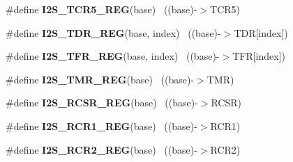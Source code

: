\begin{DoxyCompactItemize}
\item 
\hypertarget{group___i2_s___register___accessor___macros_gad75c8d22ba5ae3b82a7d2251cc70a77b}{}\#define {\bfseries I2\+S\+\_\+\+T\+C\+R5\+\_\+\+R\+E\+G}(base)                                          ~((base)-\/$>$T\+C\+R5)\label{group___i2_s___register___accessor___macros_gad75c8d22ba5ae3b82a7d2251cc70a77b}

\item 
\hypertarget{group___i2_s___register___accessor___macros_ga87e46bded71d5375c77dbe4f93f1fc5c}{}\#define {\bfseries I2\+S\+\_\+\+T\+D\+R\+\_\+\+R\+E\+G}(base,  index)                                ~((base)-\/$>$T\+D\+R\mbox{[}index\mbox{]})\label{group___i2_s___register___accessor___macros_ga87e46bded71d5375c77dbe4f93f1fc5c}

\item 
\hypertarget{group___i2_s___register___accessor___macros_ga836a44a99ae9077cdf8909db381b6b68}{}\#define {\bfseries I2\+S\+\_\+\+T\+F\+R\+\_\+\+R\+E\+G}(base,  index)                                ~((base)-\/$>$T\+F\+R\mbox{[}index\mbox{]})\label{group___i2_s___register___accessor___macros_ga836a44a99ae9077cdf8909db381b6b68}

\item 
\hypertarget{group___i2_s___register___accessor___macros_ga1ca2b4f31362bf93e985588595f2dbd1}{}\#define {\bfseries I2\+S\+\_\+\+T\+M\+R\+\_\+\+R\+E\+G}(base)                                            ~((base)-\/$>$T\+M\+R)\label{group___i2_s___register___accessor___macros_ga1ca2b4f31362bf93e985588595f2dbd1}

\item 
\hypertarget{group___i2_s___register___accessor___macros_gabb9a8ee9dfb5ae4b28895d4cb285ae16}{}\#define {\bfseries I2\+S\+\_\+\+R\+C\+S\+R\+\_\+\+R\+E\+G}(base)                                          ~((base)-\/$>$R\+C\+S\+R)\label{group___i2_s___register___accessor___macros_gabb9a8ee9dfb5ae4b28895d4cb285ae16}

\item 
\hypertarget{group___i2_s___register___accessor___macros_ga48a001dfc8fcd9cc418a17a3d0223baf}{}\#define {\bfseries I2\+S\+\_\+\+R\+C\+R1\+\_\+\+R\+E\+G}(base)                                          ~((base)-\/$>$R\+C\+R1)\label{group___i2_s___register___accessor___macros_ga48a001dfc8fcd9cc418a17a3d0223baf}

\item 
\hypertarget{group___i2_s___register___accessor___macros_ga5d3d61d720b40d692a114a1e98fd274e}{}\#define {\bfseries I2\+S\+\_\+\+R\+C\+R2\+\_\+\+R\+E\+G}(base)                                          ~((base)-\/$>$R\+C\+R2)\label{group___i2_s___register___accessor___macros_ga5d3d61d720b40d692a114a1e98fd274e}


\end{DoxyCompactItemize}
